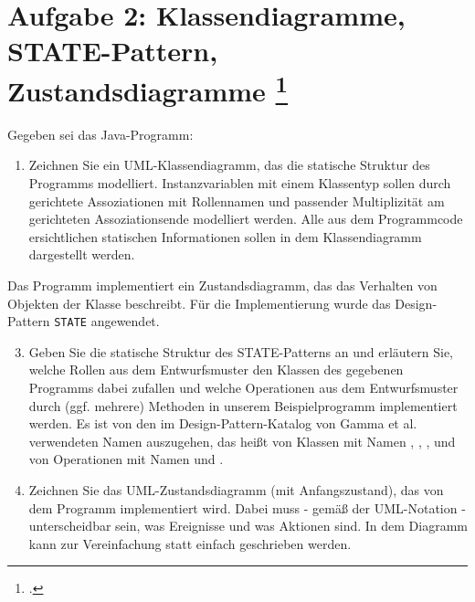 \documentclass{lehramt-informatik-aufgabe}
\begin{document}

\section{Aufgabe 2: Klassendiagramme, STATE-Pattern, Zustandsdiagramme
\footcite{examen:66116:2018:09}}

Gegeben sei das Java-Programm:


\begin{enumerate}


\item Zeichnen Sie ein UML-Klassendiagramm, das
die statische Struktur des Programms modelliert. Instanzvariablen mit
einem Klassentyp sollen durch gerichtete Assoziationen mit Rollennamen
und passender Multiplizität am gerichteten Assoziationsende modelliert
werden. Alle aus dem Programmcode ersichtlichen statischen Informationen
sollen in dem Klassendiagramm dargestellt werden.

\end{enumerate}

\noindent
Das Programm implementiert ein Zustandsdiagramm,
das das Verhalten von Objekten der Klasse  beschreibt.
Für die Implementierung wurde das Design-Pattern \texttt{STATE}
angewendet.

\begin{enumerate}
\setcounter{enumi}{2}


\item Geben Sie die statische Struktur des STATE-Patterns an und erläutern Sie, welche Rollen aus dem Entwurfsmuster den
Klassen des gegebenen Programms dabei zufallen und welche Operationen
aus dem Entwurfsmuster durch (ggf. mehrere) Methoden in unserem
Beispielprogramm implementiert werden. Es ist von den \zB im
Design-Pattern-Katalog von Gamma et al. verwendeten Namen auszugehen,
das heißt von Klassen mit Namen ,
, ,
 und von Operationen mit Namen
 und .

\item Zeichnen Sie das UML-Zustandsdiagramm (mit
Anfangszustand), das von dem Programm implementiert wird. Dabei muss -
gemäß der UML-Notation - unterscheidbar sein, was Ereignisse und was
Aktionen sind. In dem Diagramm kann zur Vereinfachung statt
 einfach 
geschrieben werden.
\end{enumerate}
\end{document}
